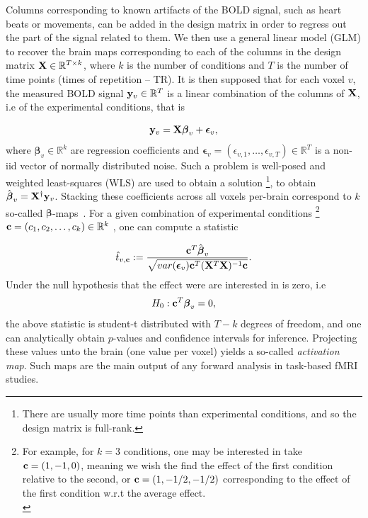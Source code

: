 Columns corresponding to known artifacts of the BOLD signal, such as heart
beats or movements, can be added in the design matrix in order to regress out
the part of the signal related to them. We then use a general linear model (GLM) to
recover the brain maps corresponding to each of the columns in the design
matrix $\mathbf{X} \in \mathbb R^{T \times k}$, where $k$ is the number of conditions and $T$ is the number of time points (times of repetition -- TR).  It is then supposed that for each voxel $v$, the measured BOLD signal $\mathbf{y}_v \in \mathbb R^T$ is a linear combination of the columns of $\mathbf{X}$, i.e of the experimental conditions, that is

\begin{equation}
  \mathbf{y}_v = \mathbf{X}\boldsymbol{\beta}_v + \boldsymbol{\epsilon}_v,
\end{equation}
where $\boldsymbol{\beta}_v \in \mathbb R^k$ are regression coefficients and $\boldsymbol{\epsilon}_v = (\epsilon_{v,1},\ldots,\epsilon_{v,T}) \in \mathbb R^T$ is a non-iid vector of normally distributed noise.
Such a problem is well-posed and weighted least-squares (WLS) are used to obtain a solution
\footnote{There are usually more time points than experimental conditions, and so the design matrix is full-rank.},
to obtain $\hat{\boldsymbol{\beta}}_v = \mathbf{X}^\dagger\mathbf{y}_v$.  Stacking these coefficients across all voxels per-brain correspond to $k$ so-called $\boldsymbol{\beta}$-maps~\citep{friston1994statistical}. For a given combination of experimental conditions \footnote{For example, for $k = 3$ conditions, one may be interested in take $\mathbf{c} = (1, -1, 0)$, meaning we wish the find the effect of the first condition relative to the second, or $\mathbf{c}=(1,-1/2,-1/2)$ corresponding to the effect of the first condition w.r.t the average effect.\\}
$\mathbf{c}  = (c_1,c_2,\ldots,c_k)\in \mathbb R^k$ , one can compute a statistic

\begin{equation}
\hat{t}_{v,\mathbf{c}} := \frac{\mathbf{c}^T\hat{\boldsymbol{\beta}}_v}{\sqrt{var(\boldsymbol{\epsilon}_v)\mathbf{c}^T(\mathbf{X}^T\mathbf{X})^{-1}\mathbf{c}}}.
\end{equation}
Under the null hypothesis that the effect were are interested in is zero, i.e
\begin{equation}
  H_0: \mathbf{c}^T\boldsymbol{\beta}_v = 0,
\end{equation}
the above statistic is student-t distributed with $T-k$ degrees of freedom, and one can
analytically obtain $p$-values and confidence intervals for inference. Projecting these values unto the brain (one value per voxel) yields a so-called \textit{activation map}. Such maps are the main output of any forward analysis in task-based fMRI studies.

